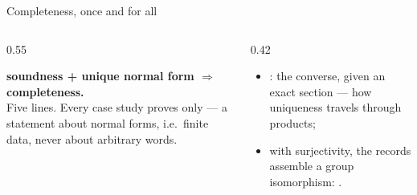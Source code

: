 \begin{frame}{Completeness, once and for all}
\begin{code}[hide]%
\>[0]\AgdaSpace{}%
\AgdaSymbol{=}\AgdaSpace{}%
\<%
\end{code}
\vspace{4pt}
\begin{columns}[c]
\begin{column}{0.55\textwidth}
\begin{win}
\textbf{soundness + unique normal form $\Rightarrow$ completeness.}\\[2pt]
\small Five lines. Every case study proves only  --- a statement
about \alert{normal forms}, i.e.\ finite data, never about arbitrary words.
\end{win}
\end{column}
\begin{column}{0.42\textwidth}
\small
\begin{itemize}
  \item {}: the converse, given an exact section --- how
        uniqueness travels through products;
  \item with surjectivity, the records assemble a group isomorphism:
        .
\end{itemize}
\end{column}
\end{columns}
\end{frame}
